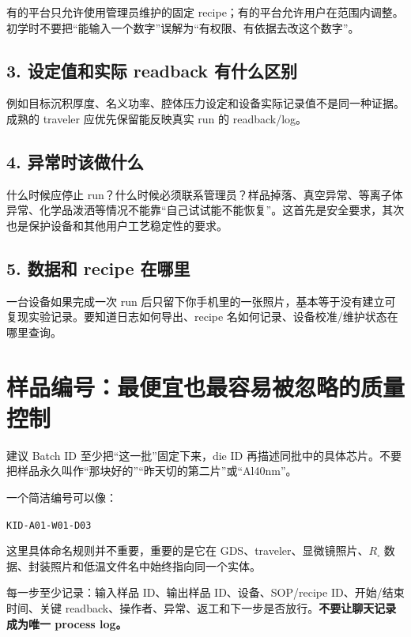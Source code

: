 有的平台只允许使用管理员维护的固定 recipe；有的平台允许用户在范围内调整。初学时不要把“能输入一个数字”误解为“有权限、有依据去改这个数字”。

\subsection{3. 设定值和实际 readback 有什么区别}

例如目标沉积厚度、名义功率、腔体压力设定和设备实际记录值不是同一种证据。成熟的 traveler 应优先保留能反映真实 run 的 readback/log。

\subsection{4. 异常时该做什么}

什么时候应停止 run？什么时候必须联系管理员？样品掉落、真空异常、等离子体异常、化学品泼洒等情况不能靠“自己试试能不能恢复”。这首先是安全要求，其次也是保护设备和其他用户工艺稳定性的要求。

\subsection{5. 数据和 recipe 在哪里}

一台设备如果完成一次 run 后只留下你手机里的一张照片，基本等于没有建立可复现实验记录。要知道日志如何导出、recipe 名如何记录、设备校准/维护状态在哪里查询。

\section{样品编号：最便宜也最容易被忽略的质量控制}

建议 Batch ID 至少把“这一批”固定下来，die ID 再描述同批中的具体芯片。不要把样品永久叫作“那块好的”“昨天切的第二片”或“Al40nm”。

一个简洁编号可以像：

\begin{center}
\texttt{KID-A01-W01-D03}
\end{center}

这里具体命名规则并不重要，重要的是它在 GDS、traveler、显微镜照片、$R_\square$ 数据、封装照片和低温文件名中始终指向同一个实体。

\begin{measurebox}
每一步至少记录：输入样品 ID、输出样品 ID、设备、SOP/recipe ID、开始/结束时间、关键 readback、操作者、异常、返工和下一步是否放行。\textbf{不要让聊天记录成为唯一 process log。}
\end{measurebox}


